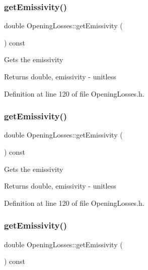 \subsubsection{\texorpdfstring{get\+Emissivity()}{getEmissivity()}\hspace{0.1cm}{\footnotesize\ttfamily [1/3]}}
{\footnotesize\ttfamily double Opening\+Losses\+::get\+Emissivity (\begin{DoxyParamCaption}{ }\end{DoxyParamCaption}) const\hspace{0.3cm}{\ttfamily [inline]}}

Gets the emissivity \begin{DoxyReturn}{Returns}
double, emissivity -\/ unitless 
\end{DoxyReturn}


Definition at line 120 of file Opening\+Losses.\+h.

\mbox{\label{class_opening_losses_a7eaf8e68f268e8ff1671c5f9f0462b4f}} 
\subsubsection{\texorpdfstring{get\+Emissivity()}{getEmissivity()}\hspace{0.1cm}{\footnotesize\ttfamily [2/3]}}
{\footnotesize\ttfamily double Opening\+Losses\+::get\+Emissivity (\begin{DoxyParamCaption}{ }\end{DoxyParamCaption}) const\hspace{0.3cm}{\ttfamily [inline]}}

Gets the emissivity \begin{DoxyReturn}{Returns}
double, emissivity -\/ unitless 
\end{DoxyReturn}


Definition at line 120 of file Opening\+Losses.\+h.

\mbox{\label{class_opening_losses_a7eaf8e68f268e8ff1671c5f9f0462b4f}} 
\subsubsection{\texorpdfstring{get\+Emissivity()}{getEmissivity()}\hspace{0.1cm}{\footnotesize\ttfamily [3/3]}}
{\footnotesize\ttfamily double Opening\+Losses\+::get\+Emissivity (\begin{DoxyParamCaption}{ }\end{DoxyParamCaption}) const\hspace{0.3cm}{\ttfamily [inline]}}

